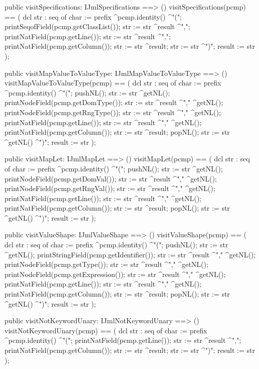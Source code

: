 \begin{vdm_al}
  public visitSpecifications: IJmlSpecifications ==> ()
  visitSpecifications(pcmp) ==
    ( dcl str : seq of char := prefix ^pcmp.identity() ^"(";
      printSeqofField(pcmp.getClassList());
      str := str ^result ^",";
      printNatField(pcmp.getLine());
      str := str ^result ^",";
      printNatField(pcmp.getColumn());
      str := str ^result;
      str := str ^")";
      result := str );

  public visitMapValueToValueType: IJmlMapValueToValueType ==> ()
  visitMapValueToValueType(pcmp) ==
    ( dcl str : seq of char := prefix ^pcmp.identity() ^"(";
      pushNL();
      str := str ^getNL();
      printNodeField(pcmp.getDomType());
      str := str ^result ^"," ^getNL();
      printNodeField(pcmp.getRngType());
      str := str ^result ^"," ^getNL();
      printNatField(pcmp.getLine());
      str := str ^result ^"," ^getNL();
      printNatField(pcmp.getColumn());
      str := str ^result;
      popNL();
      str := str ^getNL() ^")";
      result := str );

  public visitMapLet: IJmlMapLet ==> ()
  visitMapLet(pcmp) ==
    ( dcl str : seq of char := prefix ^pcmp.identity() ^"(";
      pushNL();
      str := str ^getNL();
      printNodeField(pcmp.getDomVal());
      str := str ^result ^"," ^getNL();
      printNodeField(pcmp.getRngVal());
      str := str ^result ^"," ^getNL();
      printNatField(pcmp.getLine());
      str := str ^result ^"," ^getNL();
      printNatField(pcmp.getColumn());
      str := str ^result;
      popNL();
      str := str ^getNL() ^")";
      result := str );

  public visitValueShape: IJmlValueShape ==> ()
  visitValueShape(pcmp) ==
    ( dcl str : seq of char := prefix ^pcmp.identity() ^"(";
      pushNL();
      str := str ^getNL();
      printStringField(pcmp.getIdentifier());
      str := str ^result ^"," ^getNL();
      printNodeField(pcmp.getType());
      str := str ^result ^"," ^getNL();
      printNodeField(pcmp.getExpression());
      str := str ^result ^"," ^getNL();
      printNatField(pcmp.getLine());
      str := str ^result ^"," ^getNL();
      printNatField(pcmp.getColumn());
      str := str ^result;
      popNL();
      str := str ^getNL() ^")";
      result := str );

  public visitNotKeywordUnary: IJmlNotKeywordUnary ==> ()
  visitNotKeywordUnary(pcmp) ==
    ( dcl str : seq of char := prefix ^pcmp.identity() ^"(";
      printNatField(pcmp.getLine());
      str := str ^result ^",";
      printNatField(pcmp.getColumn());
      str := str ^result;
      str := str ^")";
      result := str );


\end{vdm_al}
